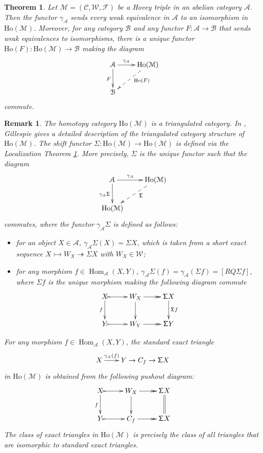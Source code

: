 \documentclass[12pt,twoside]{amsart}
\theoremstyle{bfupright head,slanted body}
\theoremstyle{bfupright head,upright body}
\theoremstyle{fixed bf head,slanted body}
\newtheorem{thm}[res]{Theorem}          \newtheorem*{thm*}{Theorem}
\theoremstyle{fixed bf head,upright body}
\newtheorem{rmk}[res]{Remark}           \newtheorem*{rmk*}{Remark}
\theoremstyle{numbered paragraph}
\numberwithin{equation}{res}
\newcommand{\calC}{\mathcal{C}}
\newcommand{\calW}{\mathcal{W}}
\newcommand{\calF}{\mathcal{F}}
\newcommand{\calA}{\mathcal{A}}
\newcommand{\calB}{\mathcal{B}}
\newcommand{\calM}{\mathcal{M}}
\newcommand{\Ho}{\mathrm{Ho}}
\newcommand{\Hom}{\operatorname{Hom}}
\begin{document}
\begin{thm}\label{loc thm}
Let \(\calM=(\calC,\calW,\calF)\) be a Hovey triple in an abelian category \(\calA\).
Then the functor \(\gamma_{\calA}\) sends every weak equivalence in \(\calA\) to an isomorphism in \(\Ho(\calM)\).
Moreover, for any category \(\calB\) and any functor \(F:\calA\to\calB\) that sends weak equivalences to isomorphisms, there is a unique functor \(\Ho(F):\Ho(\calM)\to\calB\) making the diagram
\[
\xymatrix{
  \calA
\ar[d]_{F} \ar[r]^-{\gamma_{\calA}}
& \Ho(\calM)
\ar@{-->}[dl]^(0.4){\Ho(F)} \\
  \calB
}
\]
commute.
\end{thm}


\begin{rmk} \label{tri for Ho(M)}
The homotopy category $\Ho(\calM)$ is a triangulated category. In \cite[Section 6]{2025GillBook}, Gillespie gives a detailed description of the triangulated category structure of $\Ho(\calM)$. The shift functor $\mathsf{\Sigma}: \Ho(\calM) \to \Ho(\calM)$ is defined via the Localization Theorem \ref{loc thm}.
More precisely, $\mathsf{\Sigma}$ is the unique functor such that the diagram
\[
\xymatrix{
   \calA
\ar[d]_{\gamma_{\calA} \mathsf{\Sigma}}  \ar[r]^{\gamma_{\calA} \quad}
&  \Ho(\calM)
\ar@{-->}[dl]^(0.4){\mathsf{\Sigma}}   \\
   \Ho(\calM)                      }
\]
commutes, where the functor $\gamma_{\calA} \mathsf{\Sigma}$ is defined as follows:
\begin{itemize}
\item
for an object $X \in \calA$, $\gamma_{\calA} \mathsf{\Sigma} (X) = \mathsf{\Sigma} X$, which is taken from a short exact sequence $X \rightarrowtail W_X \twoheadrightarrow \mathsf{\Sigma} X$ with $W_X \in \calW$;

\item
for any morphism $f \in \Hom_\calA(X, Y)$, $\gamma_{\calA} \mathsf{\Sigma} (f) = \gamma_{\calA} (\mathsf{\Sigma} f) = [RQ \mathsf{\Sigma} f]$, where $\mathsf{\Sigma} f$ is the unique morphism making the following diagram commute
\[
\xymatrix{
  X
\ar[d]_-{f} \ar@{>->}[r]
& W_X
\ar[d] \ar@{->>}[r]
& \mathsf{\Sigma} X
\ar[d]^-{\mathsf{\Sigma} f} \\
  Y
\ar@{>->}[r]
& W_Y
\ar@{->>}[r]
& \mathsf{\Sigma} Y                }
\]
\end{itemize}
For any morphism $f \in \Hom_\calA(X, Y)$, the \emph{standard exact triangle}
\[
\xymatrix@C=0.7cm{
  X
\ar[r]^-{\gamma_{\calA}(f)}
& Y
\rightarrow
 C_f
\rightarrow
\mathsf{\Sigma} X
}
\]
in $\Ho(\calM)$ is obtained from the following pushout diagram:
\[
\xymatrix{
  X
\ar[d]_{f}  \ar@{>->}[r]
& W_X
\ar[d] \ar@{->>}[r]
&  \mathsf{\Sigma} X
\ar@{=}[d]  \\
  Y
\ar@{>->}[r]
& C_f
\ar@{->>}[r]
&  \mathsf{\Sigma} X            }
\]
The class of \emph{exact triangles} in $\Ho(\calM)$ is precisely the class of all triangles
that are isomorphic to standard exact triangles.
\end{rmk}
\end{document}
